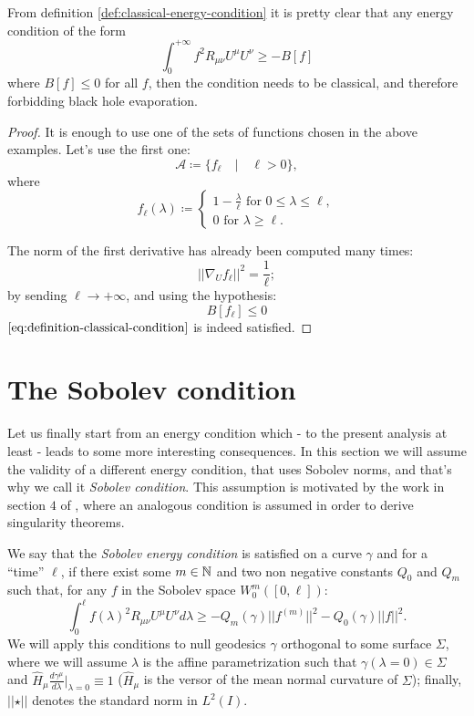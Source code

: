 	\begin{corollary}
		From definition \ref{def:classical-energy-condition} it is pretty clear that any energy condition of the form
		\[
			\int_0^{+\infty} f^2 R_{\mu\nu}U^{\mu}U^{\nu} \ge -B[f]	
		\]
		where \(B[f] \le 0\) for all \(f\), then the condition needs to be classical, and therefore forbidding black hole evaporation.
	\end{corollary}
	\begin{proof}
		It is enough to use one of the sets of functions chosen in the above examples. Let's use the first one:
		\[
		\mathcal{A} \coloneqq \{f_{\ell} \quad\vert\quad \ell >0\},
		\]
		where
		\[
			f_{\ell}(\lambda) \coloneqq
			\begin{cases}
				 1 - \frac{\lambda}{\ell} \text{ for } 0 \le \lambda \le \ell, \\	
				0 \text{ for } \lambda \ge \ell.
			\end{cases}
		\]

		The norm of the first derivative has already been computed many times:
		\[
			\vert \vert \nabla_U f_{\ell} \vert\vert^2 	= \frac{1}{\ell};
		\]
		by sending \(\ell \rightarrow +\infty\), and using the hypothesis:
		\[
			B[f_{\ell}] \le 0	
		\]
		\(\eqref{eq:definition-classical-condition}\) is indeed satisfied.
	\end{proof}

\section{The Sobolev condition}
Let us finally start from an energy condition which - to the present analysis at least - leads to some more interesting consequences.
In this section we will assume the validity of a different energy condition, that uses Sobolev norms, and that's why we call it \emph{Sobolev condition}.
This assumption is motivated by the work in section \(4\) of \cite{fewster2020new}, where an analogous condition is assumed in order to derive singularity theorems.

\begin{definition}
	We say that the \emph{Sobolev energy condition} is satisfied on a curve \(\gamma\) and for a ``time'' \(\ell\), if there exist some \(m\in {\mathbb{N}}\) and two non negative constants \(Q_0\) and \(Q_m\) such that, for any \(f\) in the Sobolev space \(W_0^m([0,\ell])\):
    \begin{equation}
        \label{eq:Sobolev-condition}
        \int_0^{\ell} f(\lambda)^2 R_{\mu\nu}U^{\mu}U^{\nu} d\lambda \ge -Q_m(\gamma) \vert\vert f^{(m)}\vert\vert^2 - Q_0(\gamma) \vert\vert f\vert\vert^2.
    \end{equation}
	\noindent
	We will apply this conditions to null geodesics \(\gamma\) orthogonal to some surface \(\Sigma\), where we will assume \(\lambda\) is the affine parametrization such that \(\gamma(\lambda = 0) \in \Sigma\) and \(\hat{H}_{\mu}\frac{d\gamma^{\mu}}{d\lambda}\Big\vert_{\lambda = 0} \equiv 1\) (\(\hat{H}_{\mu}\) is the versor of the mean normal curvature of \(\Sigma\)); finally, \(\vert\vert \star \vert\vert\) denotes the standard norm in \(L^2(I)\).
\end{definition}


